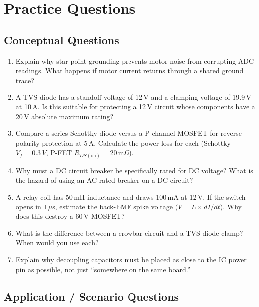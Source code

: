 \documentclass[11pt,letterpaper,twoside,openany]{book}
\begin{document}
\section{Practice Questions}
\label{sec:practice}

\subsection{Conceptual Questions}

\begin{enumerate}[leftmargin=1.5em]
  \item Explain why star-point grounding prevents motor noise from corrupting ADC readings. What happens if motor current returns through a shared ground trace?

  \item A TVS diode has a standoff voltage of 12\,V and a clamping voltage of 19.9\,V at 10\,A. Is this suitable for protecting a 12\,V circuit whose components have a 20\,V absolute maximum rating?

  \item Compare a series Schottky diode versus a P-channel MOSFET for reverse polarity protection at 5\,A. Calculate the power loss for each (Schottky $V_f = 0.3\,V$, P-FET $R_{DS(\text{on})} = 20\,\text{m}\Omega$).

  \item Why must a DC circuit breaker be specifically rated for DC voltage? What is the hazard of using an AC-rated breaker on a DC circuit?

  \item A relay coil has 50\,mH inductance and draws 100\,mA at 12\,V. If the switch opens in 1\,$\mu$s, estimate the back-EMF spike voltage ($V = L \times dI/dt$). Why does this destroy a 60\,V MOSFET?

  \item What is the difference between a crowbar circuit and a TVS diode clamp? When would you use each?

  \item Explain why decoupling capacitors must be placed as close to the IC power pin as possible, not just ``somewhere on the same board.''
\end{enumerate}

\subsection{Application / Scenario Questions}
\end{document}
